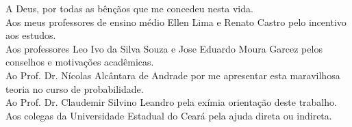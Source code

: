A Deus, por todas as bênçãos que me concedeu nesta vida.\\
Aos meus professores de ensino médio Ellen Lima e Renato Castro pelo incentivo aos estudos.\\
Aos professores Leo Ivo da Silva Souza e Jose Eduardo Moura Garcez pelos conselhos e motivações acadêmicas.\\
Ao Prof. Dr. Nícolas Alcântara de Andrade por me apresentar esta maravilhosa teoria no curso de probabilidade. \\
Ao Prof. Dr. Claudemir Silvino Leandro pela exímia orientação deste trabalho.\\
Aos colegas da Universidade Estadual do Ceará pela ajuda direta ou indireta.\\



